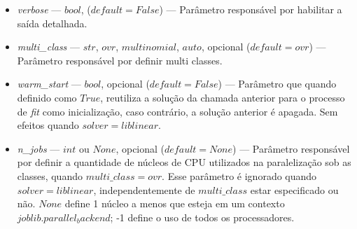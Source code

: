 \documentclass[
	12pt,				%
	oneside,			%
	a4paper,			%
	english,			%
	brazil				%
	]{abntex2ppgsi}
\begin{document}
{{{\begin{apendicesenv}
\begin{itemize}
\item \textit{verbose} --- $bool$, ($default = False$) --- Parâmetro responsável por habilitar a saída detalhada.
\item \textit{multi\_class} --- $str$, $ovr$, $multinomial$, $auto$, opcional ($default=ovr$) --- Parâmetro responsável por definir multi classes.
\item \textit{warm\_start} --- $bool$, opcional ($default=False$) --- Parâmetro que quando definido como $True$, reutiliza a solução da chamada anterior para o processo de \textit{fit} como inicialização, caso contrário, a solução anterior é apagada. Sem efeitos quando $solver=liblinear$.
\item \textit{n\_jobs} --- $int$ ou $None$, opcional ($default=None$) --- Parâmetro responsável por definir a quantidade de núcleos de CPU utilizados na paralelização sob as classes, quando $multi\_class=ovr$. Esse parâmetro é ignorado quando $solver=liblinear$, independentemente de $multi\_class$ estar especificado ou não. $None$ define 1 núcleo a menos que esteja em um contexto $joblib.parallel_backend$; -1 define o uso de todos os processadores.
\end{itemize}


\end{apendicesenv}}}}
\end{document}
